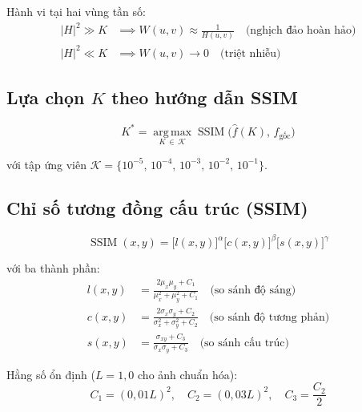 \documentclass[12pt, a4paper]{article}
\begin{document}
Hành vi tại hai vùng tần số:
\begin{align}
  \lvert H\rvert^2 \gg K &\implies W(u,v) \approx \frac{1}{H(u,v)}
    \quad \text{(nghịch đảo hoàn hảo)} \label{eq:wiener_high_snr} \\
  \lvert H\rvert^2 \ll K &\implies W(u,v) \to 0
    \quad \text{(triệt nhiễu)} \label{eq:wiener_low_snr}
\end{align}

\subsection{Lựa chọn $K$ theo hướng dẫn SSIM}

\begin{equation}
  K^* = \operatorname*{arg\,max}_{K \,\in\, \mathcal{K}}
        \operatorname{SSIM}\!\bigl(\hat{f}(K),\, f_{\mathrm{gốc}}\bigr)
  \label{eq:K_optimal}
\end{equation}

với tập ứng viên $\mathcal{K} = \{10^{-5},\,10^{-4},\,10^{-3},\,10^{-2},\,10^{-1}\}$.

\subsection{Chỉ số tương đồng cấu trúc (SSIM)}

\begin{equation}
  \operatorname{SSIM}(x,y)
  = \bigl[l(x,y)\bigr]^{\alpha}
    \bigl[c(x,y)\bigr]^{\beta}
    \bigl[s(x,y)\bigr]^{\gamma}
  \label{eq:ssim}
\end{equation}

với ba thành phần:
\begin{align}
  l(x,y) &= \frac{2\mu_x\mu_y + C_1}{\mu_x^2 + \mu_y^2 + C_1}
             \quad \text{(so sánh độ sáng)} \label{eq:ssim_l} \\[4pt]
  c(x,y) &= \frac{2\sigma_x\sigma_y + C_2}{\sigma_x^2 + \sigma_y^2 + C_2}
             \quad \text{(so sánh độ tương phản)} \label{eq:ssim_c} \\[4pt]
  s(x,y) &= \frac{\sigma_{xy} + C_3}{\sigma_x\sigma_y + C_3}
             \quad \text{(so sánh cấu trúc)} \label{eq:ssim_s}
\end{align}

Hằng số ổn định ($L = 1{,}0$ cho ảnh chuẩn hóa):
\begin{equation}
  C_1 = (0{,}01 L)^2, \quad
  C_2 = (0{,}03 L)^2, \quad
  C_3 = \frac{C_2}{2}
  \label{eq:ssim_const}
\end{equation}
\end{document}

